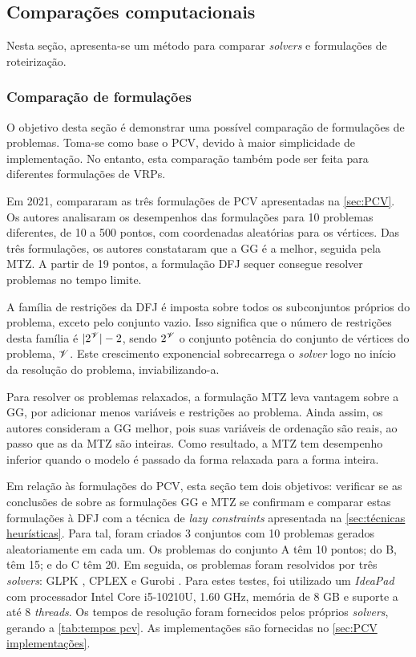 \subsection{Comparações computacionais}
Nesta seção, apresenta-se um método para comparar \emph{solvers} e formulações de roteirização.

\subsubsection{Comparação de formulações}
O objetivo desta seção é demonstrar uma possível comparação de formulações de problemas. Toma-se como base o PCV, devido à maior simplicidade de implementação. No entanto, esta comparação também pode ser feita para diferentes formulações de VRPs.

Em 2021, \textcite{BAZRAFSHAN:21} compararam as três formulações de PCV apresentadas na \cref{sec:PCV}. Os autores analisaram os desempenhos das formulações para 10 problemas diferentes, de 10 a 500 pontos, com coordenadas aleatórias para os vértices. Das três formulações, os autores constataram que a GG é a melhor, seguida pela MTZ. A partir de 19 pontos, a formulação DFJ sequer consegue resolver problemas no tempo limite.

A família de restrições da DFJ é imposta sobre todos os subconjuntos próprios do problema, exceto pelo conjunto vazio. Isso significa que o número de restrições desta família é $|2^{\mathcal{V}}| - 2$, sendo $2^{\mathcal{V}}$ o conjunto potência do conjunto de vértices do problema, $\mathcal{V}$. Este crescimento exponencial sobrecarrega o \emph{solver} logo no início da resolução do problema, inviabilizando-a.

Para resolver os problemas relaxados, a formulação MTZ leva vantagem sobre a GG, por adicionar menos variáveis e restrições ao problema. Ainda assim, os autores consideram a GG melhor, pois suas variáveis de ordenação são reais, ao passo que as da MTZ são inteiras. Como resultado, a MTZ tem desempenho inferior quando o modelo é passado da forma relaxada para a forma inteira.

Em relação às formulações do PCV, esta seção tem dois objetivos: verificar se as conclusões de \textcite{BAZRAFSHAN:21} sobre as formulações GG e MTZ se confirmam e comparar estas formulações à DFJ com a técnica de \emph{lazy constraints} apresentada na \cref{sec:técnicas heurísticas}. Para tal, foram criados 3 conjuntos com 10 problemas gerados aleatoriamente em cada um. Os problemas do conjunto A têm 10 pontos; do B, têm 15; e do C têm 20. Em seguida, os problemas foram resolvidos por três \emph{solvers}: GLPK \cite{GLPK}, CPLEX \cite{CPLEX} e Gurobi \cite{GUROBI:22}. Para estes testes, foi utilizado um \emph{IdeaPad} com processador Intel Core i5-10210U, 1.60 GHz, memória de 8 GB e suporte a até 8 \emph{threads}. Os tempos de resolução foram fornecidos pelos próprios \emph{solvers}, gerando a \cref{tab:tempos pcv}. As implementações são fornecidas no \cref{sec:PCV implementações}.

